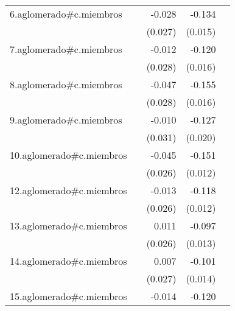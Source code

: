 {\begin{longtable}{l*{4}{D{.}{.}{-1}}}
\addlinespace
6.aglomerado#c.miembros&                     &      -0.028         &      -0.134\sym{***}&                     \\
            &                     &     (0.027)         &     (0.015)         &                     \\
\addlinespace
7.aglomerado#c.miembros&                     &      -0.012         &      -0.120\sym{***}&                     \\
            &                     &     (0.028)         &     (0.016)         &                     \\
\addlinespace
8.aglomerado#c.miembros&                     &      -0.047         &      -0.155\sym{***}&                     \\
            &                     &     (0.028)         &     (0.016)         &                     \\
\addlinespace
9.aglomerado#c.miembros&                     &      -0.010         &      -0.127\sym{***}&                     \\
            &                     &     (0.031)         &     (0.020)         &                     \\
\addlinespace
10.aglomerado#c.miembros&                     &      -0.045         &      -0.151\sym{***}&                     \\
            &                     &     (0.026)         &     (0.012)         &                     \\
\addlinespace
12.aglomerado#c.miembros&                     &      -0.013         &      -0.118\sym{***}&                     \\
            &                     &     (0.026)         &     (0.012)         &                     \\
\addlinespace
13.aglomerado#c.miembros&                     &       0.011         &      -0.097\sym{***}&                     \\
            &                     &     (0.026)         &     (0.013)         &                     \\
\addlinespace
14.aglomerado#c.miembros&                     &       0.007         &      -0.101\sym{***}&                     \\
            &                     &     (0.027)         &     (0.014)         &                     \\
\addlinespace
15.aglomerado#c.miembros&                     &      -0.014         &      -0.120\sym{***}&                     \\

\end{longtable}}
